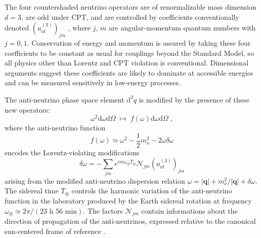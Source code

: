 The four countershaded neutrino operators are of renormalizable mass dimension $d = 3$, are odd under CPT, and are controlled by coefficients conventionally denoted $(a^{(3)}_\text{of})_{jm}$ , where $j$, $m$ are angular-momentum quantum numbers with $j = 0,1$. Conservation of energy and momentum is assured by taking these four coefficients to be constant as usual for couplings beyond the Standard Model, so all physics other than Lorentz and CPT violation is conventional. Dimensional arguments suggest these coefficients are likely to dominate at accessible energies and can be measured sensitively in low-energy processes.


The anti-neutrino phase space element $\text{d}^3q$ is modified by the presence of these new operators:
\[\omega^2\text{d}\omega\text{d}\Omega \;\longmapsto\; f(\omega)\text{d}\omega\text{d}\Omega\;,\]
where the anti-neutrino function
\[f(\omega)\simeq\omega^2-\frac{1}{2}m_\nu^2-2\omega\delta\omega\]
encodes the Lorentz-violating modifications
\[\delta\omega=-\sum_{jm}e^{im\omega_\oplus T_\oplus}\mathcal{N}_{jm}(a_\text{of}^{(3)})_{jm}\]
arising from the modified anti-neutrino dispersion relation \cite{SMEneutrinos} $\omega=|\mathbf{q}|+m_\nu^2/|\mathbf{q}|+\delta\omega$. The sidereal time $T_\oplus$ controls the harmonic variation of the anti-neutrino function in the laboratory produced by the Earth sidereal rotation at frequency $\omega_\oplus\simeq 2\pi/(23\text{ h } 56\text{ min})$. The factors $\mathcal{N}_{jm}$ contain informations about the direction of propagation of the anti-neutrinos, expressed relative to the canonical sun-centered frame of reference \cite{frameor1,frameor2}.

